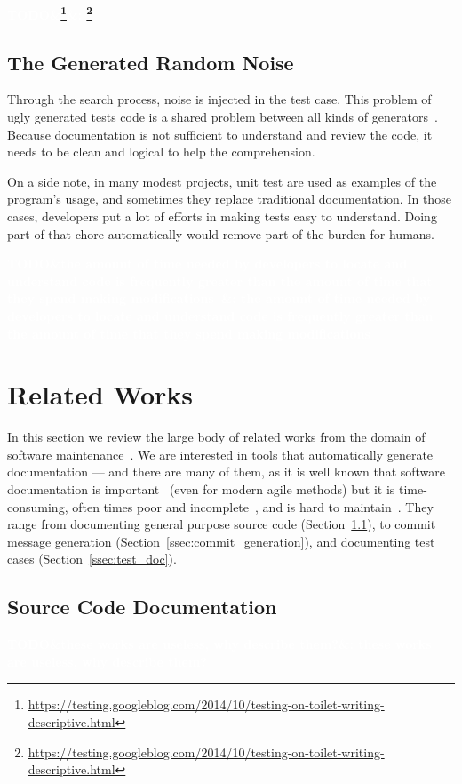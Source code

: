 \documentclass[11pt]{sdm_internship}
\newcommand{\todo}[1]{\colorbox{Red!75}{\textcolor{white}{\textbf{TODO\ifx&#1&\else: #1\fi}}}}
\theoremstyle{definition}
\begin{document}
\todo{\footnote{\url{https://testing.googleblog.com/2014/10/testing-on-toilet-writing-descriptive.html}}}

\subsection{The Generated Random Noise}%
\label{ssec:random_noise}
Through the search process, noise is injected in the test case.
This problem of ugly generated tests code is a shared problem between all kinds of generators~\cite{rojas2017search}.
Because documentation is not sufficient to understand and review the code, it needs to be clean and logical to help the comprehension.

On a side note, in many modest projects, unit test are used as examples of the program's usage, and sometimes they replace traditional documentation.
In those cases, developers put a lot of efforts in making tests easy to understand.
Doing part of that chore automatically would remove part of the burden for humans.

\todo{the amount of time needed by developers to locate and understand code is frequently greater than the amount of time that they spend making modifications~\cite{ko2006exploratory}}


\section{Related Works}%
\label{sec:related_works}
In this section we review the large body of related works from the domain of software maintenance~\cite{swanson1976dimensions}.
We are interested in tools that automatically generate documentation --- and there are many of them, as it is well known that software documentation is important~\cite{de2005study} (even for modern agile methods) but it is time-consuming, often times poor and incomplete~\cite{briand2003software}, and is hard to maintain~\cite{forward2002relevance}.
They range from documenting general purpose source code (Section~\ref{ssec:doc_generation}), to commit message generation (Section~\ref{ssec:commit_generation}), and documenting test cases (Section~\ref{ssec:test_doc}).

\subsection{Source Code Documentation}%
\label{ssec:doc_generation}
\todo{these works are useless, why describe them?}
\end{document}
